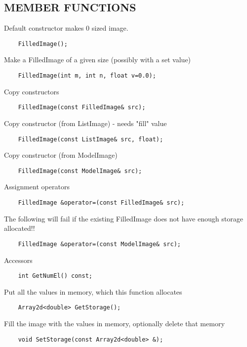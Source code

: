 \subsection*{MEMBER FUNCTIONS}

       Default constructor makes 0 sized image.
\begin{verbatim}
    FilledImage();
\end{verbatim}

       Make a FilledImage of a given size (possibly with a set value)
\begin{verbatim}
    FilledImage(int m, int n, float v=0.0);
\end{verbatim}

       Copy constructors 
\begin{verbatim}
    FilledImage(const FilledImage& src);
\end{verbatim}

       Copy constructor (from ListImage) - needs "fill" value
\begin{verbatim}
    FilledImage(const ListImage& src, float);
\end{verbatim}

       Copy constructor (from ModelImage)
\begin{verbatim}
    FilledImage(const ModelImage& src);
\end{verbatim}

       Assignment operators
\begin{verbatim}
    FilledImage &operator=(const FilledImage& src);
\end{verbatim}

       The following will fail if the existing FilledImage does not
       have enough storage allocated!!
\begin{verbatim}
    FilledImage &operator=(const ModelImage& src); 
\end{verbatim}

       Accessors
\begin{verbatim}
    int GetNumEl() const;
\end{verbatim}

       Put all the values in memory, which this function allocates
\begin{verbatim}
    Array2d<double> GetStorage();
\end{verbatim}

       Fill the image with the values in memory, optionally delete that memory
\begin{verbatim}
    void SetStorage(const Array2d<double> &);
\end{verbatim}

